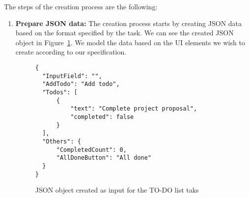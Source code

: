 The steps of the creation process are the following:
\begin{enumerate}
\item \textbf{Prepare JSON data:} The creation process starts by creating JSON data based on the format specified by the task.
We can see the created JSON object in Figure~\ref{fig:todo-json}.
We model the data based on the UI elements we wish to create according to our specification.
\begin{figure}[!htbp]
	\caption{JSON object created as input for the TO-DO list taks}
	\label{fig:todo-json}
	\begin{lstlisting}
{
  "InputField": "",
  "AddTodo": "Add todo",
  "Todos": [
      {
          "text": "Complete project proposal",
          "completed": false
      }
  ],
  "Others": {
      "CompletedCount": 0,
      "AllDoneButton": "All done"
  }
}
    \end{lstlisting}
\end{figure}



\end{enumerate}
